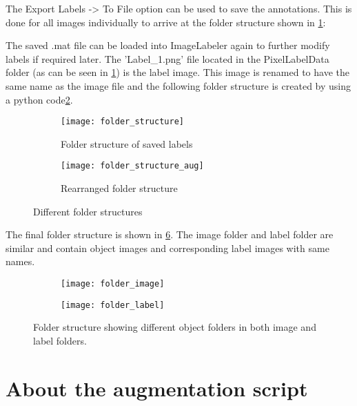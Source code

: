 \documentclass[paper=a4,11pt,parskip=half,toc=listof]{scrartcl}
\begin{document}
The Export Labels -> To File option can be used to save the annotations. This is done for all images individually to arrive at the folder structure shown in \ref{Fig:5a}:
	
The saved .mat file can be loaded into ImageLabeler again to further modify labels if required later. The 'Label\_1.png' file located in the PixelLabelData folder (as can be seen in \ref{Fig:5a}) is the label image. This image is renamed to have the same name as the image file and the following folder structure is created by using a python code\ref{Fig:5b}.
	
\begin{center}
	\begin{figure}[!htb]
		\begin{subfigure}{.5\textwidth}
			\centering
			\texttt{[image: folder\_structure]}
			\caption{Folder structure of saved labels}
			\label{Fig:5a}
		\end{subfigure}
		\begin{subfigure}{.5\textwidth}
			\centering
			\texttt{[image: folder\_structure\_aug]}
			\caption{Rearranged folder structure}
			\label{Fig:5b}
		\end{subfigure}
		\caption{Different folder structures}
		\label{Fig:5}
	\end{figure}
\end{center}

The final folder structure is shown in \ref{Fig:6}. The image folder and label folder are similar and contain object images and corresponding label images with same names.

\begin{center}
	\begin{figure}[!htb]
		\begin{subfigure}{.5\textwidth}
			\centering
			\texttt{[image: folder\_image]}
			\label{Fig:6a}
		\end{subfigure}
		\begin{subfigure}{.5\textwidth}
			\centering
			\texttt{[image: folder\_label]}
			\label{Fig:6b}
		\end{subfigure}
		\caption{Folder structure showing different object folders in both image and label folders.}
		\label{Fig:6}
	\end{figure}
\end{center}

\section{About the augmentation script}
\end{document}
